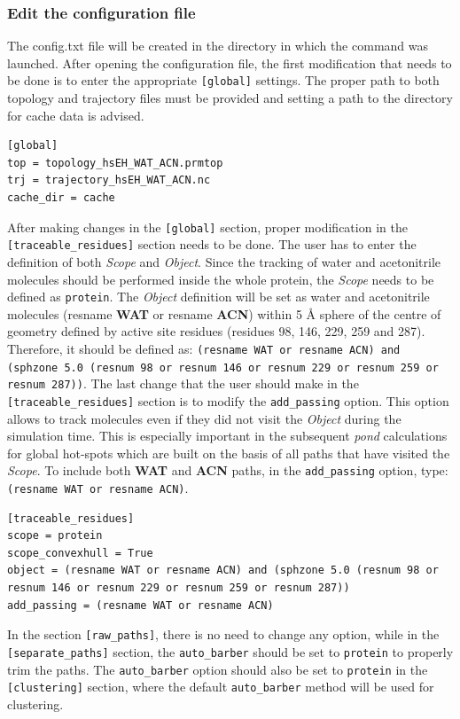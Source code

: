 \documentclass[9pt,tutorial, pubversion]{livecoms}
\begin{document}
\subsubsection{Edit the configuration file}
The config.txt file will be created in the directory in which the command was launched. After opening the configuration file, the first modification that needs to be done is to enter the appropriate \texttt{[global]} settings. The proper path to both topology and trajectory files must be provided and setting a path to the directory for cache data is advised. 
\begin{lstlisting}
[global]
top = topology_hsEH_WAT_ACN.prmtop
trj = trajectory_hsEH_WAT_ACN.nc
cache_dir = cache
\end{lstlisting}
After making changes in the \texttt{[global]} section, proper modification in the \texttt{[traceable\_residues]} section needs to be done. The user has to enter the definition of both \emph{Scope} and \emph{Object}. Since the tracking of water and acetonitrile molecules should be performed inside the whole protein, the \textit{Scope} needs to be defined as \texttt{protein}. The \emph{Object} definition will be set as water and acetonitrile molecules (resname \textbf{WAT} or resname \textbf{ACN}) within 5 Å sphere of the centre of geometry defined by active site residues (residues 98, 146, 229, 259 and 287). Therefore, it should be defined as: \texttt{(resname WAT or resname ACN) and (sphzone 5.0 (resnum 98 or resnum 146 or resnum 229 or resnum 259 or resnum 287))}. The last change that the user should make in the \texttt{[traceable\_residues]} section is to modify the \texttt{add\_passing} option. This option allows to track molecules even if they did not visit the \emph{Object} during the simulation time. This is especially important in the subsequent \emph{pond} calculations for global hot-spots which are built on the basis of all paths that have visited the \emph{Scope}. To include both \textbf{WAT} and \textbf{ACN} paths, in the \texttt{add\_passing} option, type: \texttt{(resname WAT or resname ACN)}.
\begin{lstlisting}
[traceable_residues]
scope = protein
scope_convexhull = True
object = (resname WAT or resname ACN) and (sphzone 5.0 (resnum 98 or resnum 146 or resnum 229 or resnum 259 or resnum 287))
add_passing = (resname WAT or resname ACN)
\end{lstlisting}
In the section \texttt{[raw\_paths]}, there is no need to change any option, while in the \texttt{[separate\_paths]} section, the \texttt{auto\_barber} should be set to \texttt{protein} to properly trim the paths. The \texttt{auto\_barber} option should also be set to \texttt{protein} in the \texttt{[clustering]} section, where the default \texttt{auto\_barber} method will be used for clustering. 
\end{document}
